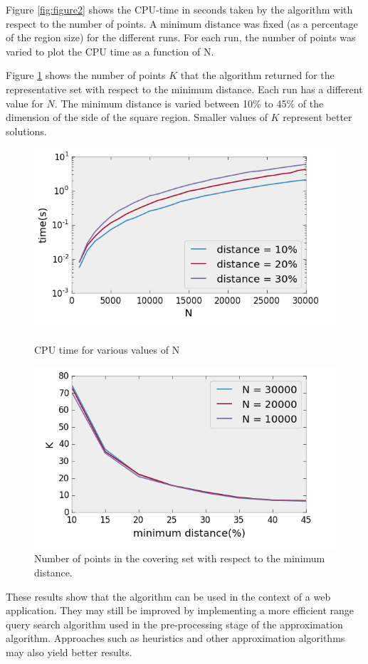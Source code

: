 \documentclass[twocolumn, 9pt]{article}
\begin{document}
Figure \ref{fig:figure2} shows the CPU-time in seconds taken by the algorithm with respect to the number of points. A minimum distance was fixed (as a percentage of the region size) for the different runs. For each run, the number of points was varied to plot the CPU time as a function of N.

Figure \ref{fig:figure3} shows the number of points $K$ that the algorithm returned for the representative set with respect to the minimum distance. Each run has a different value for $N$. The minimum distance is varied between 10\% to 45\% of the dimension of the side of the square region.  Smaller values of $K$ represent better solutions.

\begin{figure}[h]	
	\centering
	\includegraphics[width=.49\textwidth]{res1.png}
	\caption{CPU time for various values of N}
	\label{fig:figure2}
	\includegraphics[width=.49\textwidth]{res2.png}
	\caption{Number of points in the covering set with respect to the minimum distance.}
	\label{fig:figure3}
\end{figure}

These results show that the algorithm can be used in the context of a web application. They may still be improved by implementing a more efficient range query search algorithm used in the pre-processing stage of the approximation algorithm. Approaches such as heuristics and other approximation algorithms may also yield better results.

\end{document}
